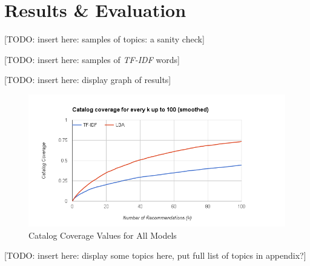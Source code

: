 \chapter{Results \& Evaluation} \label{chp:chapter3}

[TODO: insert here: samples of topics: a sanity check]

[TODO: insert here: samples of \emph{TF-IDF} words]

[TODO: insert here: display graph of results]

\begin{figure}[hhhhhtb]
	\centering
		\includegraphics[width=5.5in,natwidth=510,natheight=642]{figures/catalog_coverage_0_100.png}
		\caption[Catalog Coverage Values for All Models]{
			Catalog Coverage Values for All Models
		}
	\label{fig:catalog_coverage_0_100}
\end{figure}

[TODO: insert here: display some topics here, put full list of topics in appendix?]
